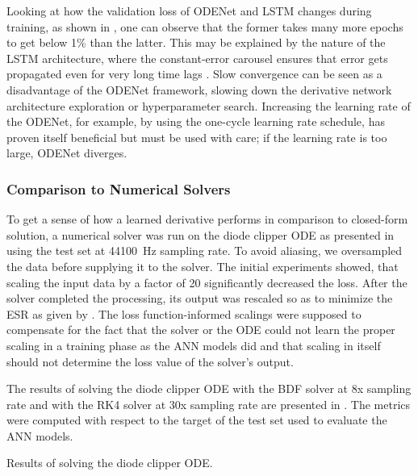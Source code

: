Looking at how the validation loss of ODENet and LSTM changes during training, as shown in , one can observe that the former takes many more epochs to get below 1\% than the latter. This may be explained by the nature of the \ac{LSTM} architecture, where the constant-error carousel ensures that error gets propagated even for very long time lags \cite{Hochreiter1997}. Slow convergence can be seen as a disadvantage of the ODENet framework, slowing down the derivative network architecture exploration or hyperparameter search. Increasing the learning rate of the ODENet, for example, by using the one-cycle learning rate schedule, has proven itself beneficial but must be used with care; if the learning rate is too large, ODENet diverges.

\subsubsection{Comparison to Numerical Solvers}

To get a sense of how a learned derivative performs in comparison to closed-form solution, a numerical solver was run on the diode clipper \ac{ODE} as presented in  using the test set at \SI{44100}{Hz} sampling rate. To avoid aliasing, we oversampled the data before supplying it to the solver. The initial experiments showed, that scaling the input data by a factor of 20 significantly decreased the loss. After the solver completed the processing, its output was rescaled so as to minimize the \ac{ESR} as given by . The loss function-informed scalings were supposed to compensate for the fact that the solver or the \ac{ODE} could not learn the proper scaling in a training phase as the \ac{ANN} models did and that scaling in itself should not determine the loss value of the solver's output. 

The results of solving the diode clipper \ac{ODE} with the \ac{BDF} solver at 8x sampling rate and with the \ac{RK}4 solver at 30x sampling rate are presented in . The metrics were computed with respect to the target of the test set used to evaluate the \ac{ANN} models.

\begin{table}[]
    \centering
    \caption{Results of solving the diode clipper \ac{ODE}.}
    
    \label{tab:diode_clipper_ode_solvers}
\end{table}

